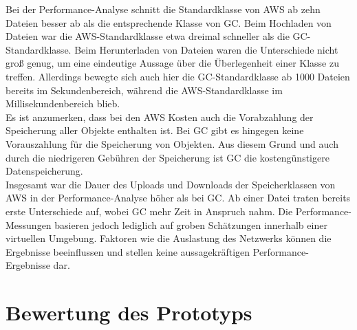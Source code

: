 Bei der Performance-Analyse schnitt die Standardklasse von AWS ab zehn Dateien besser ab als die entsprechende Klasse von GC. Beim Hochladen von Dateien war die AWS-Standardklasse etwa dreimal schneller als die GC-Standardklasse. Beim Herunterladen von Dateien waren die Unterschiede nicht groß genug, um eine eindeutige Aussage über die Überlegenheit einer Klasse zu treffen. Allerdings bewegte sich auch hier die GC-Standardklasse ab 1000 Dateien bereits im Sekundenbereich, während die AWS-Standardklasse im Millisekundenbereich blieb.\\

Es ist anzumerken, dass bei den AWS Kosten auch die Vorabzahlung der Speicherung aller Objekte enthalten ist. Bei GC gibt es hingegen keine Vorauszahlung für die Speicherung von Objekten. Aus diesem Grund und auch durch die niedrigeren Gebühren der Speicherung ist GC die kostengünstigere Datenspeicherung.\\

Insgesamt war die Dauer des Uploads und Downloads der Speicherklassen von AWS in der Performance-Analyse höher als bei GC. Ab einer Datei traten bereits erste Unterschiede auf, wobei GC mehr Zeit in Anspruch nahm. Die Performance-Messungen basieren jedoch lediglich auf groben Schätzungen innerhalb einer virtuellen Umgebung. Faktoren wie die Auslastung des Netzwerks können die Ergebnisse beeinflussen und stellen keine aussagekräftigen Performance-Ergebnisse dar.\\

\section{Bewertung des Prototyps}


